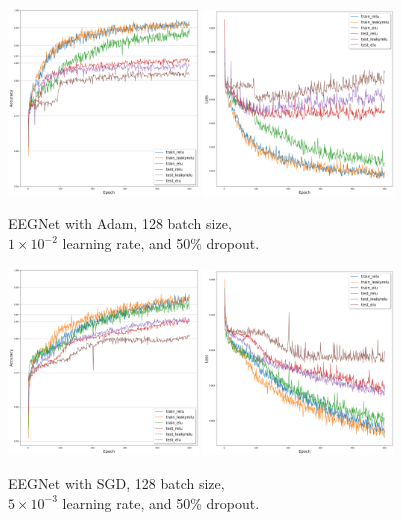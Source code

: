 	\begin{figure}[H]
	  \centering
		\includegraphics[width=0.45\textwidth]{results/eegnet_adam_128_0.01_0.5_acc.png}
		\includegraphics[width=0.45\textwidth]{results/eegnet_adam_128_0.01_0.5_loss.png}
		\caption{EEGNet with Adam, 128 batch size, \\ $1 \times 10^{-2}$ learning rate, and 50\% dropout.}
   	\end{figure}
	\begin{figure}[H]
		\centering
		\includegraphics[width=0.45\textwidth]{results/eegnet_sgd_128_0.005_0.5_acc.png}
		\includegraphics[width=0.45\textwidth]{results/eegnet_sgd_128_0.005_0.5_loss.png}
		\caption{EEGNet with SGD, 128 batch size, \\ $5 \times 10^{-3}$ learning rate, and 50\% dropout.}
   	\end{figure}
